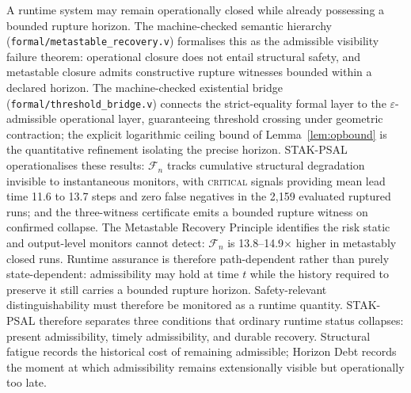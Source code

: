 \documentclass{llncs}
\newcommand{\st}[1]{\textup{\textsc{#1}}}
\begin{document}
A runtime system may remain operationally closed while already
possessing a bounded rupture horizon. The machine-checked semantic
hierarchy (\texttt{formal/\allowbreak{}metastable\_recovery.v}) formalises this as
the admissible visibility failure theorem: operational closure does not
entail structural safety, and metastable closure admits constructive
rupture witnesses bounded within a declared horizon. The machine-checked
existential bridge (\texttt{formal/\allowbreak{}threshold\_bridge.v}) connects the
strict-equality formal layer to the $\varepsilon$-admissible operational
layer, guaranteeing threshold crossing under geometric contraction;
the explicit logarithmic ceiling bound of Lemma~\ref{lem:opbound}
is the quantitative refinement isolating the precise horizon.
STAK-PSAL operationalises these results: $\mathcal{F}_n$ tracks
cumulative structural degradation invisible to instantaneous monitors,
with \st{critical} signals providing mean lead time 11.6 to 13.7 steps
and zero false negatives in the 2,159 evaluated ruptured runs; and the
three-witness certificate emits a bounded rupture witness on confirmed
collapse. The Metastable Recovery Principle identifies the risk static
and output-level monitors cannot detect: $\mathcal{F}_n$ is
13.8--14.9$\times$ higher in metastably closed runs. Runtime assurance is therefore path-dependent rather than purely
state-dependent: admissibility may hold at time \(t\) while the history
required to preserve it still carries a bounded rupture horizon. Safety-relevant distinguishability must therefore be monitored as a
runtime quantity. STAK-PSAL therefore separates three conditions that ordinary runtime status collapses: present admissibility, timely admissibility, and durable recovery. Structural fatigue records the historical cost of remaining admissible; Horizon Debt records the moment at which admissibility remains extensionally visible but operationally too late.


\end{document}
